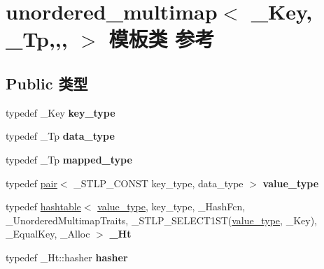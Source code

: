 \hypertarget{classunordered__multimap}{}\section{unordered\+\_\+multimap$<$ \+\_\+\+Key, \+\_\+\+Tp,,, $>$ 模板类 参考}
\label{classunordered__multimap}
\subsection*{Public 类型}
\begin{DoxyCompactItemize}
\item 
\mbox{\label{classunordered__multimap_a1de6c4926424bee9d8433fb55883a35e}} 
typedef \+\_\+\+Key {\bfseries key\+\_\+type}
\item 
\mbox{\label{classunordered__multimap_a3221d4d22635d542b74f30b8cb5b0e01}} 
typedef \+\_\+\+Tp {\bfseries data\+\_\+type}
\item 
\mbox{\label{classunordered__multimap_a3b24f26595934ac341357b8a39309ca4}} 
typedef \+\_\+\+Tp {\bfseries mapped\+\_\+type}
\item 
\mbox{\label{classunordered__multimap_a8d43b737e2ce402675c124119aff3c05}} 
typedef \hyperlink{structpair}{pair}$<$ \+\_\+\+S\+T\+L\+P\+\_\+\+C\+O\+N\+ST key\+\_\+type, data\+\_\+type $>$ {\bfseries value\+\_\+type}
\item 
\mbox{\label{classunordered__multimap_a7a1fb5d8b6640aac0646643430fd3676}} 
typedef \hyperlink{classhashtable}{hashtable}$<$ \hyperlink{structpair}{value\+\_\+type}, key\+\_\+type, \+\_\+\+Hash\+Fcn, \+\_\+\+Unordered\+Multimap\+Traits, \+\_\+\+S\+T\+L\+P\+\_\+\+S\+E\+L\+E\+C\+T1\+ST(\hyperlink{structpair}{value\+\_\+type}, \+\_\+\+Key), \+\_\+\+Equal\+Key, \+\_\+\+Alloc $>$ {\bfseries \+\_\+\+Ht}
\item 
\mbox{\label{classunordered__multimap_a93242bd2665cfd6ab36912686ba25b16}} 
typedef \+\_\+\+Ht\+::hasher {\bfseries hasher}
\item 
\mbox{\label{classunordered__multimap_af8527a0ba9f17250508c629128cbfb92}} 

\end{DoxyCompactItemize}
